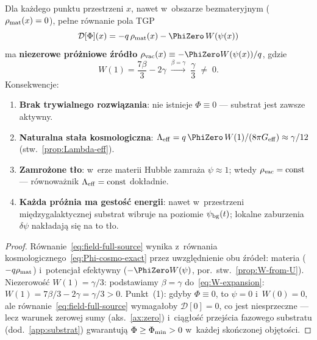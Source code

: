 \begin{theorem}%
\label{thm:vacuum-source}
Dla ka\.zdego punktu przestrzeni $x$, nawet w~obszarze
bezmateryjnym ($\rho_{\rm mat}(x) = 0$), pe\l{}ne r\'ownanie pola TGP
\begin{equation}\label{eq:field-full-source}
  \mathcal{D}[\Phi](x)
  = -q\,\rho_{\rm mat}(x) - \PhiZero\,W(\psi(x))
\end{equation}
ma \textbf{niezerowe pr\'o\.zniowe \'zr\'od\l{}o}
$\rho_{\rm vac}(x) \equiv -\PhiZero W(\psi(x))/q$, gdzie
\begin{equation}\label{eq:W1-nonzero}
  W(1) = \frac{7\beta}{3} - 2\gamma
  \;\xrightarrow{\beta=\gamma}\;
  \frac{\gamma}{3} \;\neq\; 0.
\end{equation}
Konsekwencje:
\begin{enumerate}[nosep]
  \item \textbf{Brak trywialnego rozwi\k{a}zania}:
    nie istnieje $\Phi \equiv 0$ --- substrat jest zawsze aktywny.
  \item \textbf{Naturalna sta\l{}a kosmologiczna}:
    $\Lambda_{\rm eff} = q\,\PhiZero\,W(1)/(8\pi G_{\rm eff})
    \approx \gamma/12$ (stw.~\ref{prop:Lambda-eff}).
  \item \textbf{Zamro\.zone t\l{}o}: w~erze materii
    Hubble zamra\.za $\psi \approx 1$; wtedy
    $\rho_{\rm vac} = \mathrm{const}$ --- r\'ownowa\.znik
    $\Lambda_{\rm eff} = \mathrm{const}$ dok\l{}adnie.
  \item \textbf{Ka\.zda pr\'o\.znia ma gesto\'s\'c energii}:
    nawet w~przestrzeni mi\k{e}dzygalaktycznej substrat
    wibruje na poziomie $\psi_{\rm bg}(t)$;
    lokalne zaburzenia $\delta\psi$ nak\l{}adaj\k{a}
    si\k{e} na to t\l{}o.
\end{enumerate}
\end{theorem}

\begin{proof}
R\'ownanie~\eqref{eq:field-full-source} wynika z~r\'ownania
kosmologicznego~\eqref{eq:Phi-cosmo-exact} przez uw\-zgl\k{e}dnienie
obu \'zr\'ode\l{}: materia ($-q\rho_{\rm mat}$) i~potencja\l{} efektywny
($-\PhiZero W(\psi)$, por.~stw.~\ref{prop:W-from-U}).
Niezerowo\'s\'c $W(1) = \gamma/3$: podstawiamy $\beta = \gamma$
do~\eqref{eq:W-expansion}: $W(1) = 7\beta/3 - 2\gamma = \gamma/3 > 0$.
Punkt~(1): gdyby $\Phi \equiv 0$, to $\psi = 0$ i~$W(0) = 0$,
ale r\'ownanie~\eqref{eq:field-full-source} wymaga\l{}oby
$\mathcal{D}[0] = 0$, co jest niesprzeczne --- lecz
warunek zerowej sumy (aks.~\ref{ax:zero}) i~ci\k{a}g\l{}o\'s\'c
przej\'scia fazowego substratu (dod.~\ref{app:substrat}) gwarantuj\k{a}
$\Phi \geq \Phi_{\rm min} > 0$ w~ka\.zdej sko\'nczonej
obj\k{e}to\'sci.
\end{proof}

